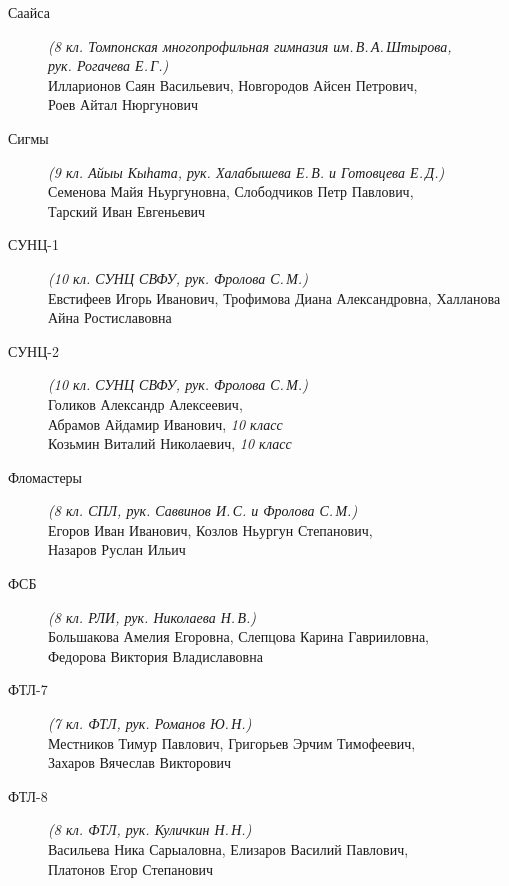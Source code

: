 \begin{description}
\item[Саайса] \textit{(8 кл. Томпонская многопрофильная гимназия им.\,В.\,А.\,Штырова, \\
рук. Рогачева Е.\,Г.)} \\
Илларионов Саян Васильевич, Новгородов Айсен Петрович, \\
Роев Айтал Нюргунович

\item[Сигмы] \textit{(9 кл. Айыы Кыһата, рук. Халабышева Е.\,В. и Готовцева Е.\,Д.)} \\
Семенова Майя Ньургуновна, Слободчиков Петр Павлович, \\
Тарский Иван Евгеньевич

\item[СУНЦ-1] \textit{(10 кл. СУНЦ СВФУ, рук. Фролова С.\,М.)} \\
Евстифеев Игорь Иванович, Трофимова Диана Александровна, Халланова Айна Ростиславовна

\item[СУНЦ-2] \textit{(10 кл. СУНЦ СВФУ, рук. Фролова С.\,М.)} \\
Голиков Александр Алексеевич, \\
Абрамов Айдамир Иванович, \textit{10 класс} \\
Козьмин Виталий Николаевич, \textit{10 класс}

\item[Фломастеры] \textit{(8 кл. СПЛ, рук. Саввинов И.\,С. и Фролова С.\,М.)} \\
Егоров Иван Иванович, Козлов Ньургун Степанович, \\
Назаров Руслан Ильич

\item[ФСБ] \textit{(8 кл. РЛИ, рук. Николаева Н.\,В.)} \\
Большакова Амелия Егоровна, Слепцова Карина Гаврииловна, \\
Федорова Виктория Владиславовна

\item[ФТЛ-7] \textit{(7 кл. ФТЛ, рук. Романов Ю.\,Н.)} \\
Местников Тимур Павлович, Григорьев Эрчим Тимофеевич, \\
Захаров Вячеслав Викторович

\item[ФТЛ-8] \textit{(8 кл. ФТЛ, рук. Куличкин Н.\,Н.)} \\
Васильева Ника Сарыаловна, Елизаров Василий Павлович, \\
Платонов Егор Степанович


\end{description}

